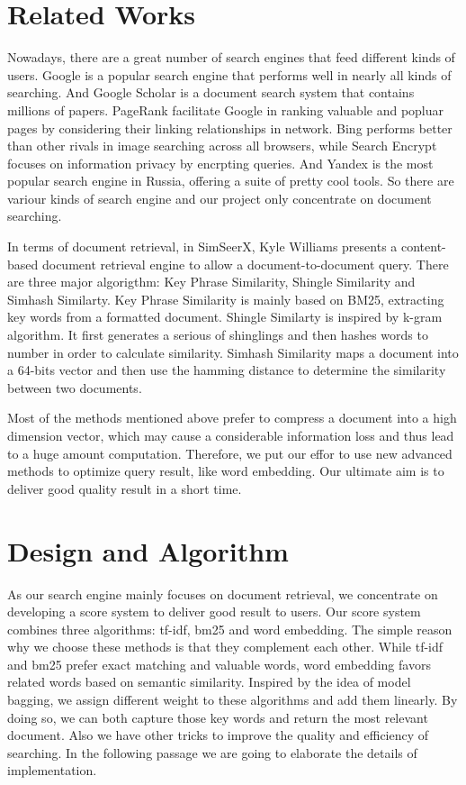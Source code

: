 \documentclass[UTF8]{article}
\begin{document}
	
	
	
	\section{Related Works}
	Nowadays, there are a great number of search engines that feed different kinds of users. Google is a popular search engine that performs well in nearly all kinds of searching. And Google Scholar is a document search system that contains millions of papers. PageRank facilitate Google in ranking valuable and popluar pages by considering their linking relationships in network. Bing performs better than other rivals in image searching across all browsers, while Search Encrypt focuses on information privacy by encrpting queries. And Yandex is the most popular search engine in Russia, offering a suite of pretty cool tools. So there are variour kinds of search engine and our project only concentrate on document searching.
	
	In terms of document retrieval, in SimSeerX, Kyle Williams presents a content-based document retrieval engine to allow a document-to-document query. There are three major algorigthm: Key Phrase Similarity, Shingle Similarity and Simhash Similarty. Key Phrase Similarity is mainly based on BM25, extracting key words from a formatted document. Shingle Similarty is inspired by k-gram algorithm. It first generates a serious of shinglings and then hashes words to number in order to calculate similarity. Simhash Similarity maps a document into a 64-bits vector and then use the hamming distance to determine the similarity between two documents. 
	
	Most of the methods mentioned above prefer to compress a document into a high dimension vector, which may cause a considerable information loss and thus lead to a huge amount computation. Therefore, we put our effor to use new advanced methods to optimize query result, like word embedding. Our ultimate aim is to deliver good quality result in a short time.
	
	
	\section{Design and Algorithm}
	As our search engine mainly focuses on document retrieval, we concentrate on developing a score system to deliver good result to users. Our score system combines three algorithms: tf-idf, bm25 and word embedding. The simple reason why we choose these methods is that they complement each other. While tf-idf and bm25 prefer exact matching and valuable words, word embedding favors related words based on semantic similarity. Inspired by the idea of model bagging, we assign different weight to these algorithms and add them linearly. By doing so, we can both capture those key words and return the most relevant document. Also we have other tricks to improve the quality and efficiency of searching. In the following passage we are going to elaborate the details of implementation.
	
\end{document}
